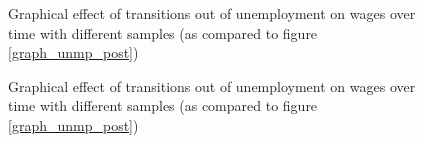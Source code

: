 \begin{figure}
    \caption{Graphical effect of transitions out of unemployment on wages over time with different samples (as compared to figure \ref{graph_unmp_post})}
    \label{graph_post_employed_2}
\end{figure}

\begin{figure}
    \caption{Graphical effect of transitions out of unemployment on wages over time with different samples (as compared to figure \ref{graph_unmp_post})}
    \label{graph_post_employed_1}
\end{figure}



